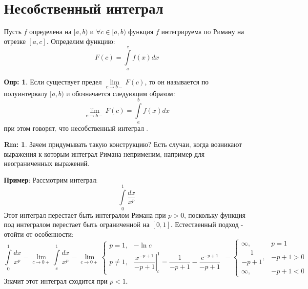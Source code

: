 \documentclass[12pt]{article}
\theoremstyle{definition}
\newtheorem{defn}{Опр:}
\newtheorem{rem}{Rm:}
\newcommand{\ddint}[2]{\displaystyle\int\limits_{#1}^{#2}}
\begin{document}
\section*{Несобственный интеграл}
Пусть $f$ определена на $[a,b)$ и $\forall c \in [a,b)$ функция $f$ интегрируема по Риману на отрезке $[a,c]$. Определим функцию:
$$
	F(c) = \ddint{a}{c} f(x)dx
$$

\begin{defn}
	Если существует предел $\lim\limits_{c \to b-} F(c)$, то он называется  по полуинтервалу $[a,b)$ и обозначается следующим образом:
	$$
		\lim\limits_{c \to b-} F(c) = \ddint{a}{b} f(x)dx
	$$
	при этом говорят, что несобственный интеграл .
\end{defn}

\begin{rem}
	Зачем придумывать такую конструкцию? Есть случаи, когда возникают выражения к которым интеграл Римана неприменим, например для неограниченных выражений.
\end{rem}

\textbf{Пример}: Рассмотрим интеграл:
$$
	\ddint{0}{1}\dfrac{dx}{x^p}
$$
Этот интеграл перестает быть интегралом Римана при $p > 0$, поскольку функция под интегралом перестает быть ограниченной на $[0,1]$. Естественный подход - отойти от особенности:
$$
	\ddint{0}{1}\dfrac{dx}{x^p} = \lim\limits_{c \to 0+} \ddint{c}{1} \dfrac{dx}{x^p} = \lim\limits_{c \to 0+}
	\begin{cases}
		p =1, & -\ln{c} \\
		p \neq 1, & \left. \dfrac{x^{-p + 1}}{-p + 1}\right|_c^1 = \dfrac{1}{-p +1} - \dfrac{c^{-p+1}}{-p + 1}
	\end{cases}
	=
	\begin{cases}
		\infty, &p = 1 \\
		\dfrac{1}{-p +1} , & -p + 1 > 0 \\
		\infty, & -p + 1 < 0
	\end{cases}
$$
Значит этот интеграл сходится при $p < 1$.
\end{document}
